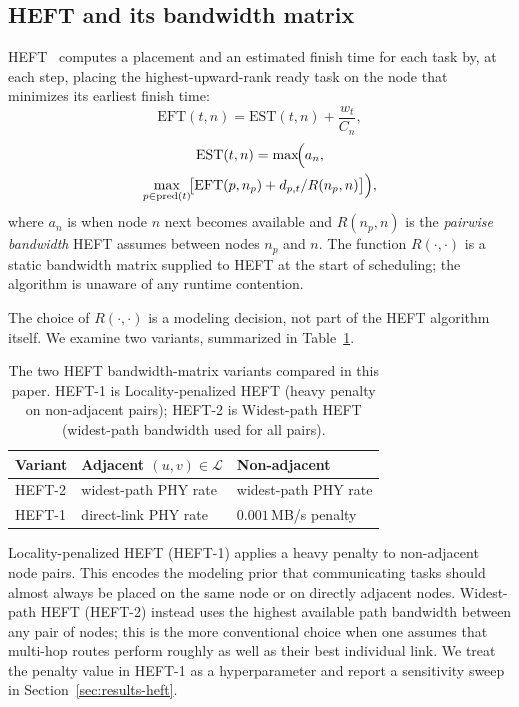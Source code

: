 \documentclass[conference]{IEEEtran}
\newcommand{\heftone}{HEFT-1}
\newcommand{\hefttwo}{HEFT-2}
\begin{document}
\subsection{HEFT and its bandwidth matrix}

HEFT~\cite{topcuoglu2002heft} computes a placement and an estimated finish
time for each task by, at each step, placing the highest-upward-rank ready
task on the node that minimizes its earliest finish time:
\begin{equation}
\mathrm{EFT}(t,n) = \mathrm{EST}(t,n) + \frac{w_t}{C_n},
\label{eq:eft}
\end{equation}
\begin{multline}
\mathrm{EST}(t,n) = \max\!\Bigl( a_n,\\
\max_{p\in\mathrm{pred}(t)}\!\bigl[\mathrm{EFT}(p,n_p) + d_{p,t}/R(n_p,n)\bigr]\Bigr),
\label{eq:est}
\end{multline}
where $a_n$ is when node $n$ next becomes available and $R(n_p,n)$ is the
\emph{pairwise bandwidth} HEFT assumes between nodes $n_p$ and $n$. The
function $R(\cdot,\cdot)$ is a static bandwidth matrix supplied to HEFT at
the start of scheduling; the algorithm is unaware of any runtime contention.

The choice of $R(\cdot,\cdot)$ is a modeling decision, not part of the HEFT
algorithm itself. We examine two variants, summarized in
Table~\ref{tab:heftvariants}.

\begin{table}[t]
\centering
\caption{The two HEFT bandwidth-matrix variants compared in this paper.
\heftone{} is Locality-penalized HEFT (heavy penalty on non-adjacent
pairs); \hefttwo{} is Widest-path HEFT (widest-path bandwidth used for
all pairs).}
\label{tab:heftvariants}
\footnotesize
\setlength{\tabcolsep}{3pt}
\begin{tabular}{l l l}
\toprule
\textbf{Variant} & \textbf{Adjacent} $(u,v)\in\mathcal{L}$ & \textbf{Non-adjacent} \\
\midrule
\hefttwo{} & widest-path PHY rate & widest-path PHY rate \\
\heftone{} & direct-link PHY rate & $0.001$\,MB/s penalty \\
\bottomrule
\end{tabular}
\end{table}

Locality-penalized HEFT (\heftone{}) applies a heavy penalty to
non-adjacent node pairs. This encodes the modeling prior that
communicating tasks should almost always be placed on the same node or on
directly adjacent nodes. Widest-path HEFT (\hefttwo{}) instead uses the
highest available path bandwidth between any pair of nodes; this is the
more conventional choice when one assumes that multi-hop routes perform
roughly as well as their best individual link. We treat the penalty value
in \heftone{} as a hyperparameter and report a sensitivity sweep in
Section~\ref{sec:results-heft}.
\end{document}
